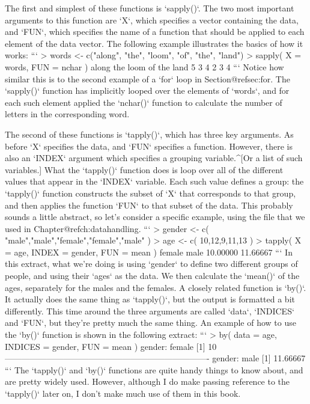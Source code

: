 The first and simplest of these functions is `sapply()`. The two most important arguments to this function are `X`, which specifies a vector containing the data, and `FUN`, which specifies the name of a function that should be applied to each element of the data vector. The following example illustrates the basics of how it works:
```
> words <- c("along", "the", "loom", "of", "the", "land")
> sapply( X = words, FUN = nchar )
along   the  loom    of   the  land 
    5     3     4     2     3     4 
```
Notice how similar this is to the second example of a `for` loop in Section@refsec:for. The `sapply()` function has implicitly looped over the elements of `words`, and for each such element applied the `nchar()` function to calculate the number of letters in the corresponding word.

The second of these functions is `tapply()`, which has three key arguments. As before `X` specifies the data, and `FUN` specifies a function. However, there is also an `INDEX` argument which specifies a grouping variable.^[Or a list of such variables.] What the `tapply()` function does is loop over all of the different values that appear in the `INDEX` variable. Each such value defines a group: the `tapply()` function constructs the subset of `X` that corresponds to that group, and then applies the function `FUN` to that subset of the data. This probably sounds a little abstract, so let's consider a specific example, using the  file that we used in Chapter@refch:datahandling. 
```
> gender <- c( "male","male","female","female","male" )
> age <- c( 10,12,9,11,13 )
> tapply( X = age, INDEX = gender, FUN = mean )
  female     male 
10.00000 11.66667
```
In this extract, what we're doing is using `gender` to define two different groups of people, and using their `ages` as the data. We then calculate the `mean()` of the ages, separately for the males and the females. A closely related function is `by()`. It actually does the same thing as `tapply()`, but the output is formatted  a bit differently. This time around the three arguments are called `data`, `INDICES` and `FUN`, but they're pretty much the same thing. An example of how to use the `by()` function is shown in the following extract:
```
> by( data = age, INDICES = gender, FUN = mean )
gender: female
[1] 10
------------------------------------------------------------------------- 
gender: male
[1] 11.66667
```
The `tapply()` and `by()` functions are quite handy things to know about, and are pretty widely used. However, although I do make passing reference to the `tapply()` later on, I don't make much use of them in this book.

